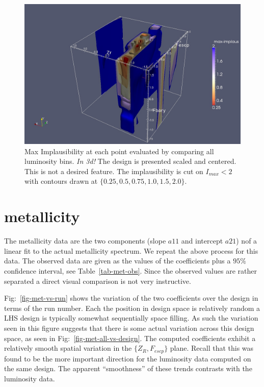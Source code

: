 \documentclass[11pt]{article}
\begin{document}
\begin{figure}
  \begin{center}
    \includegraphics[width=\textwidth]{./images/lum-anim.jpg}
    \caption{Max Implausibility at each point evaluated by comparing
      all luminosity bins. \emph{In 3d!} The design is presented
      scaled and centered. This is not a desired feature. The implausibility
      is cut on $I_{max} < 2$ with contours drawn at $\{0.25, 0.5, 0.75,
      1.0, 1.5, 2.0\}$.}
    \label{fig-implaus-comb-cube}
    \end{center}
\end{figure}


\section{metallicity}

The metallicity data are the two components (slope $a11$ and intercept
$a21$) nof a linear fit to the
actual metallicity spectrum. We repeat the above process for this
data. The observed data are given as the values of the coefficients
plus a $95\%$ confidence interval, see Table~\ref{tab-met-obs}. Since
the observed values are rather separated  a direct visual comparison
is not very instructive. 

Fig:~\ref{fig-met-vs-run} shows the variation of the two coefficients
over the design in terms of the run number. Each the position in
design space is relatively random a LHS design is typically somewhat
sequentially space filling. As such the variation seen in this figure
suggests that there is some actual variation across this design space,
as seen in Fig:~\ref{fig-met-all-vs-design}. The computed coefficients exhibit
a relatively smooth spatial variation in the $\{Z_R,
F_{escp}\}$ plane. Recall that this was found to be the more important
direction for the luminosity data computed on the same design. The
apparent ``smoothness'' of these trends contrasts with the luminosity data.
\end{document}
